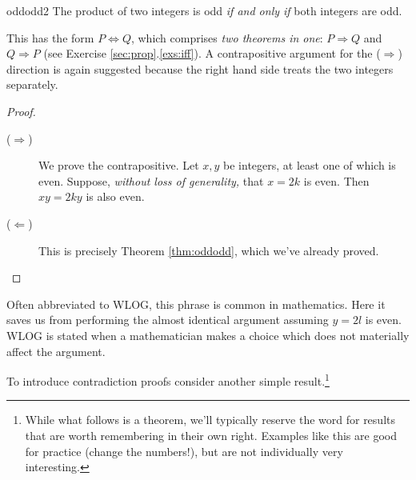 \begin{thm}{}{oddodd2}
	The product of two integers is odd \emph{if and only if} both integers are odd.
\end{thm}

This has the form $P\Longleftrightarrow Q$, which comprises \emph{two theorems in one}: $P\Longrightarrow Q$ and $Q\Longrightarrow P$ (see Exercise \ref*{sec:prop}.\ref{exs:iff}). A contrapositive argument for the ($\Rightarrow$) direction is again suggested because the right hand side treats the two integers separately.

\begin{proof}
\begin{description}
	\item[\normalfont ($\Rightarrow$)] We prove the contrapositive. Let $x,y$ be integers, at least one of which is even. Suppose, \emph{without loss of generality,} that $x=2k$ is even. Then $xy=2ky$ is also even.
	\item[\normalfont ($\Leftarrow$)] This is precisely Theorem \ref{thm:oddodd}, which we've already proved.\qedhere
\end{description}
\end{proof}

 Often abbreviated to WLOG, this phrase is common in mathematics. Here it saves us from performing the almost identical argument assuming  $y=2l$ is even. WLOG is stated when a mathematician makes a choice which does not materially affect the argument.



To introduce contradiction proofs consider another simple result.\footnote{While what follows is a theorem, we'll typically reserve the word for results that are worth remembering in their own right. Examples like this are good for practice (change the numbers!), but are not individually very interesting.}


